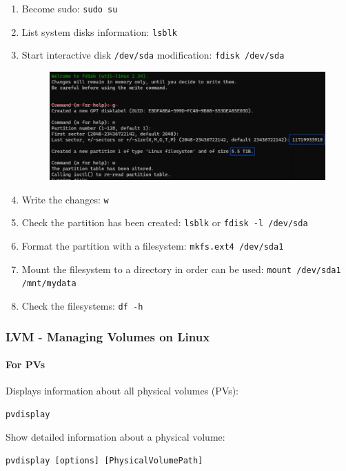 \documentclass{article}
\newenvironment{codetemplate}[1][]{%
  \mybasecolorbox[#1]
  \itshape
}{%
  \endmybasecolorbox
}
\begin{document}
\begin{enumerate}
    \item Become sudo: \verb|sudo su|
    \item List system disks information: \verb|lsblk|
    \item Start interactive disk \verb|/dev/sda| modification: \verb|fdisk /dev/sda|
\begin{figure}[H]
    \includegraphics[width=\textwidth]{pictures/fdiskk.png}
    \centering
\end{figure}

    \item Write the changes: \verb|w|
    \item Check the partition has been created: \verb|lsblk| or \verb|fdisk -l /dev/sda|
    \item Format the partition with a filesystem: \verb|mkfs.ext4 /dev/sda1|
    \item Mount the filesystem to a directory in order can be used: \verb|mount /dev/sda1 /mnt/mydata|
    \item Check the filesystems: \verb|df -h|
\end{enumerate}

\subsubsection{LVM - Managing Volumes on Linux}

\paragraph{For PVs}

Displays information about all physical volumes (PVs):
\begin{codetemplate}
\begin{verbatim}
pvdisplay
\end{verbatim}
\end{codetemplate}

Show detailed information about a physical volume:
\begin{codetemplate}
\begin{verbatim}
pvdisplay [options] [PhysicalVolumePath]
\end{verbatim}
\end{codetemplate}
\end{document}
